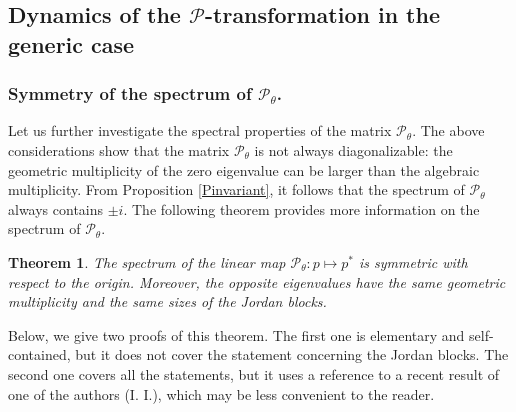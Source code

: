 \documentclass[12pt]{article}
\newtheorem{theorem}{Theorem}
\newcommand{\Pev}{\mathcal{P}}
\begin{document}
\subsection{Dynamics of the $\Pev$-transformation in the generic case}\label{Dyngeneric}
\subsubsection{Symmetry of the spectrum of $\Pev_\theta$.}
Let us further investigate the spectral properties of the matrix $\Pev_\theta$. The above  considerations show  that the matrix $\Pev_\theta$ is not always diagonalizable: the geometric multiplicity of the zero eigenvalue can be larger than the algebraic multiplicity. 
From Proposition \ref{Pinvariant}, it follows that the spectrum of $\Pev_\theta$ always contains $\pm i$. The following theorem provides more information on the spectrum of $\Pev_\theta$.

\begin{theorem}
\label{SymSpectrum}
The spectrum of the linear map $\Pev_\theta \colon p \mapsto p^*$ is symmetric with respect to the origin. Moreover, the opposite eigenvalues have the same geometric multiplicity and the same sizes of the Jordan blocks.
\end{theorem}

Below, we give two proofs of this theorem. The first one is elementary and self-contained, but it does not cover the statement concerning the Jordan blocks. The second one covers all the statements, but it uses a reference to a recent result of one of the authors (I. I.), which may be less convenient to the reader.
\end{document}
